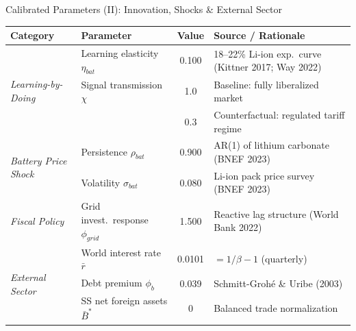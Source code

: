 \documentclass[aspectratio=169,10pt]{beamer}
\begin{document}
\begin{frame}{Calibrated Parameters (II): Innovation, Shocks \& External Sector}
	\begin{center}
		\small
		\renewcommand{\arraystretch}{1.25}
		\begin{tabular}{@{}llcl@{}}
			\toprule
			\textbf{Category} & \textbf{Parameter} & \textbf{Value} & \textbf{Source / Rationale}\\
			\midrule
			\multirow{3}{*}{\textit{Learning-by-Doing}}
			& Learning elasticity $\eta_{bat}$ & 0.100 & 18--22\% Li-ion exp.\ curve (Kittner 2017; Way 2022)\\
			& Signal transmission $\chi$       & 1.0   & Baseline: fully liberalized market\\
			&                                  & 0.3   & Counterfactual: regulated tariff regime\\
			\midrule
			\multirow{2}{*}{\textit{Battery Price Shock}}
			& Persistence $\rho_{bat}$         & 0.900 & AR(1) of lithium carbonate (BNEF 2023)\\
			& Volatility $\sigma_{bat}$        & 0.080 & Li-ion pack price survey (BNEF 2023)\\
			\midrule
			\textit{Fiscal Policy}
			& Grid invest.\ response $\phi_{grid}$ & 1.500 & Reactive lag structure (World Bank 2022)\\
			\midrule
			\multirow{3}{*}{\textit{External Sector}}
			& World interest rate $\bar{r}$     & 0.0101 & $=1/\beta-1$ (quarterly)\\
			& Debt premium $\phi_b$             & 0.039  & Schmitt-Grohé \& Uribe (2003)\\
			& SS net foreign assets $\bar{B}^*$ & 0      & Balanced trade normalization\\
			\bottomrule
		\end{tabular}
	\end{center}
\end{frame}
\end{document}
